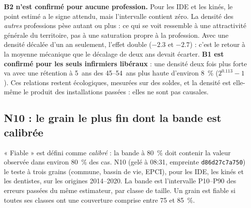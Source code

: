 \documentclass[11pt]{article}
\begin{document}
\textbf{B2 n'est confirmé pour aucune profession.} Pour les IDE et les kinés, le point estimé a le
signe attendu, mais l'intervalle contient zéro. La densité des \emph{autres} professions pèse
autant ou plus : ce qui se voit ressemble à une attractivité générale du territoire, pas à une
saturation propre à la profession. Avec une densité décalée d'un an seulement, l'effet double
($\num{-2.3}$ et $\num{-2.7}$\mesure{}) : c'est le retour à la moyenne mécanique que le décalage de deux
ans devait écarter. \textbf{B1 est confirmé pour les seuls infirmiers libéraux} : une densité deux fois
plus forte va avec une rétention à 5~ans des 45--54~ans plus haute d'environ
8\derive{}~\% ($2^{0.113} - 1$). Ces relations restent écologiques, mesurées sur des soldes, et la
densité est elle-même le produit des installations passées : elles ne sont pas causales.

\subsection{N10 : le grain le plus fin dont la bande est calibrée}
« Fiable » est défini comme \emph{calibré} : la bande à 80~\% doit contenir la valeur observée dans
environ 80~\% des cas. N10 (gelé à 08:31, empreinte \texttt{d86d27c7a750}) le teste à trois grains
(commune, bassin de vie, EPCI), pour les IDE, les kinés et les dentistes, sur les origines
2014--2020. La bande est l'intervalle P10--P90 des erreurs passées du même estimateur, par classe de
taille. Un grain est fiable si toutes ses classes ont une couverture comprise entre 75 et 85~\%.
\end{document}
